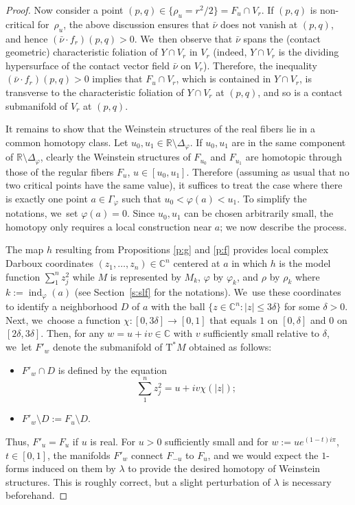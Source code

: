 \documentclass[10pt]{amsart}
\newcommand{\C}{{\mathbb C}}
\newcommand{\R}{{\mathbb R}}
\newcommand{\Crit}{\Gamma_{\!\varphi}}
\newcommand{\Discr}{\Delta_\varphi}
\newcommand{\ind}{\operatorname{ind}}
\newcommand{\etc}{,\ldots,}
\newcommand{\sT}{\mathrm{T}^\ast}
\newcommand{\cnu}{\bar\nu}
\newcommand{\de}{\mathrel{:=}}
\newcommand{\with}{\mathrel{:}}
\let\on\colon
\theoremstyle{plain}
\theoremstyle{definition}
\begin{document}
\begin{proof}
Now consider a point $(p,q) \!\in\! \{\rho_u \!=\! r^2/2\} = F_u \cap V_r$. If $(p,q)$
is non-critical for~$\rho_u$, the above discussion ensures that $\cnu$ does not
vanish at $(p,q)$, and hence \hbox{$(\cnu \cdot f_r) (p,q) > 0$}. We~then observe that
$\cnu$ spans the (contact geometric) characteristic foliation of $Y \cap V_r$ in
$V_r$ (indeed, $Y \cap V_r$ is the dividing hypersurface of the contact vector
field $\cnu$ on $V_r$). Therefore, the inequality $(\cnu \cdot f_r) (p,q) > 0$
implies that $F_u \cap V_r$, which is contained in $Y \cap V_r$, is transverse
to the characteristic foliation of $Y \cap V_r$ at $(p,q)$, and so is a contact
submanifold of $V_r$ at $(p,q)$.

It remains to show that the Weinstein structures of the real fibers lie in a
common homotopy class. Let $u_0, u_1 \in \R \setminus \Discr$. If $u_0, u_1$ are in the
same component of $\R \setminus \Discr$, clearly the Weinstein structures of $F_{u_0}$
and $F_{u_1}$ are homotopic through those of the regular fibers $F_u$, $u \in
[u_0,u_1]$. Therefore (assuming as usual that no two critical points have the
same value), it suffices to treat the case where there is exactly one point $a
\in \Crit$ such that $u_0 < \varphi(a) < u_1$. To simplify the notations, we~set
$\varphi(a) = 0$. Since $u_0, u_1$ can be chosen arbitrarily small, the homotopy
only requires a local construction near $a$; we now describe the process.

The map $h$ resulting from Propositions \ref{p:g} and \ref{p:f} provides local
complex Darboux coordinates $(z_1 \etc z_n) \in \C^n$ centered at $a$ in which
$h$ is the model function $\sum_1^n z_j^2$ while $M$ is represented by $M_k$,
$\varphi$ by $\varphi_k$, and $\rho$ by $\rho_k$ where $k \de \ind_\varphi(a)$
(see Section~\ref{s:slf} for the notations). We~use these coordinates to
identify a neighborhood $D$ of $a$ with the ball $\{z \in \C^n \with |z| \le 3
\delta\}$ for some $\delta>0$. Next, we~choose a function $\chi \on [0,3\delta]
\to [0,1]$ that equals $1$ on $[0,\delta]$ and $0$ on $[2\delta,3\delta]$. Then,
for any $w = u+iv \in \C$ with $v$ sufficiently small relative to $\delta$, we~let $F'_w$ denote the submanifold of $\sT M$ obtained as follows:
\begin{itemize}
\item
$F'_w \cap D$ is defined by the equation
\[
\sum_1^n z_j^2 = u + i v \chi(|z|);
\]
\item
$F'_w\setminus D \de F_u\setminus D$.
\end{itemize}
Thus, $F'_u = F_u$ if $u$ is real. For $u>0$ sufficiently small and for $w \de
u e^{(1-t)i\pi}$, $t \in [0,1]$, the manifolds $F'_w$ connect $F_{-u}$ to $F_u$,
and we would expect the $1$-forms induced on them by $\lambda$ to provide the
desired homotopy of Weinstein structures. This is roughly correct, but a slight
perturbation of $\lambda$ is necessary beforehand.


\end{proof}
\end{document}
